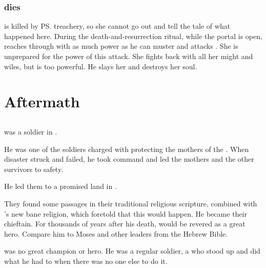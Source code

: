 \subsubsection{\Vexstrasshin{} dies}
\Vexstrasshin{} is killed by \ps{\Daggerrain} treachery, so she cannot go out and tell the tale of what happened here. 
During the death-and-resurrection ritual, while the portal is open, \Daggerrain{} reaches through with as much power as he can muster and attacks \Vexstrasshin. 
She is unprepared for the power of this attack. 
She fights back with all her might and wiles, but \Daggerrain{} is too powerful. 
He slays her and destroys her soul. 















\section{Aftermath}









\subsection{\Morza}
 was a \nephil soldier in \Numah.

He was one of the soldiers charged with protecting the mothers of the \resphain.
When disaster struck and \Thanatzil failed, he took command and led the mothers and the other survivors to safety.

He led them to a promised land in \Nyx.

They found some passages in their traditional religious scripture, combined with \Semiza's new bane religion, which foretold that this would happen.
He became their chieftain.
For thousands of years after his death, \Morza would be revered as a great hero.
Compare him to Moses and other leaders from the Hebrew Bible.

\Morza was no great champion or hero. 
He was a regular soldier, a  who stood up and did what he had to when there was no one else to do it. 









